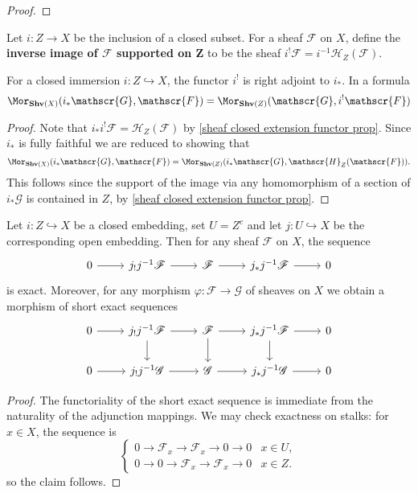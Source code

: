 \begin{proof}

\end{proof}
\begin{definition}
Let $i:Z\to X$ be the inclusion of a closed subset. For a sheaf $\mathscr{F}$ on $X$, define the \textbf{inverse image of $\mathscr{F}$ supported on $\bm{Z}$} to be the sheaf $i^!\mathscr{F}=i^{-1}\mathscr{H}_Z(\mathscr{F})$.
\end{definition}
\begin{proposition}
For a closed immersion $i:Z\hookrightarrow X$, the functor $i^!$ is right adjoint to $i_*$. In a formula
\[\Mor_{\mathbf{Shv}(X)}(i_*\mathscr{G},\mathscr{F})=\Mor_{\mathbf{Shv}(Z)}(\mathscr{G},i^!\mathscr{F})\]
\end{proposition}
\begin{proof}
Note that $i_*i^!\mathscr{F}=\mathscr{H}_Z(\mathscr{F})$ by \cref{sheaf closed extension functor prop}. Since $i_*$ is fully faithful we are reduced to showing that
\[\Mor_{\mathbf{Shv}(X)}(i_*\mathscr{G},\mathscr{F})=\Mor_{\mathbf{Shv}(Z)}(i_*\mathscr{G},\mathscr{H}_Z(\mathscr{F})).\]
This follows since the support of the image via any homomorphism of a section of $i_*\mathscr{G}$ is contained in $Z$, by \cref{sheaf closed extension functor prop}.
\end{proof}
\begin{proposition}
Let $i:Z\hookrightarrow X$ be a closed embedding, set $U=Z^c$ and let $j:U\hookrightarrow X$ be the corresponding open embedding. Then for any sheaf $\mathscr{F}$ on $X$, the sequence
\[\begin{tikzcd}
0\ar[r]&j_!j^{-1}\mathscr{F}\ar[r]&\mathscr{F}\ar[r]&j_*j^{-1}\mathscr{F}\ar[r]&0
\end{tikzcd}\]
is exact. Moreover, for any morphism $\varphi:\mathscr{F}\to\mathscr{G}$ of sheaves on $X$ we obtain a morphism of short exact sequences
\[\begin{tikzcd}
0\ar[r]&j_!j^{-1}\mathscr{F}\ar[r]\ar[d]&\mathscr{F}\ar[r]\ar[d]&j_*j^{-1}\mathscr{F}\ar[r]\ar[d]&0\\
0\ar[r]&j_!j^{-1}\mathscr{G}\ar[r]&\mathscr{G}\ar[r]&j_*j^{-1}\mathscr{G}\ar[r]&0
\end{tikzcd}\]
\end{proposition}
\begin{proof}
The functoriality of the short exact sequence is immediate from the naturality of the adjunction mappings. We may check exactness on stalks: for $x\in X$, the sequence is
\[\begin{cases}
0\to\mathscr{F}_x\to\mathscr{F}_x\to 0\to 0&x\in U,\\
0\to0\to\mathscr{F}_x\to \mathscr{F}_x\to 0&x\in Z.
\end{cases}\]
so the claim follows.
\end{proof}
